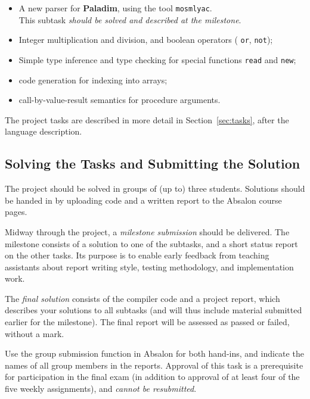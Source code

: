 \documentclass[12pt,a4paper]{article}
\newcommand{\paladim}{\textbf{Paladim}\xspace}
\begin{document}
\begin{itemize}
\setlength{\itemsep}{0.1ex}

\item A new parser for \paladim, using the tool \texttt{mosmlyac}.\\
    This subtask \emph{should be solved and described at the milestone}.

\item Integer multiplication and division, and boolean operators
(%
\texttt{or}, \texttt{not});

\item Simple type inference and type checking for special functions \texttt{read} and \texttt{new};

\item code generation for indexing into arrays;

\item call-by-value-result semantics for procedure arguments.

\end{itemize}
The project tasks are described in more detail in Section~\ref{sec:tasks},
after the language description.

\subsection{Solving the Tasks and Submitting the Solution}

The project should be solved in groups of (up to) three students.
%
Solutions should be handed in by uploading code and a written 
report to the Absalon course pages.

Midway through the project, a \emph{milestone submission} should be delivered.
The milestone consists of a solution to one of the subtasks,
and a short status report on the other tasks. Its purpose is to enable early
feedback from teaching assistants about report writing style, testing
methodology, and implementation work.

The \emph{final solution} consists of the compiler code and a
project report, which describes your solutions to all subtasks
(and will thus include material submitted earlier for the milestone).
The final report will be assessed as passed or failed, without a mark.

Use the group submission function in Absalon for both
hand-ins, and indicate the names of all group members in the reports.
Approval of this task is a prerequisite for participation in the
final exam (in addition to approval of at least four of the five
weekly assignments), and \emph{cannot be resubmitted}.
\end{document}
